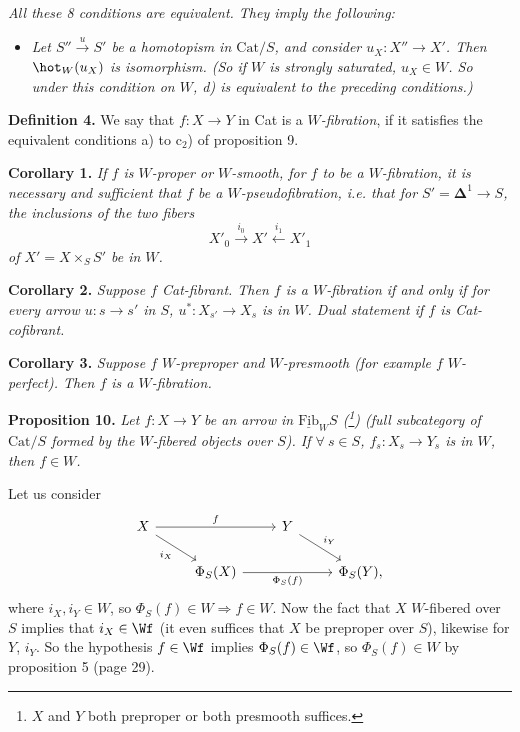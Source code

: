 \textit{All these 8 conditions are equivalent. They imply the following:}

\begin{itemize}[leftmargin=4em]
\item[\textit{d)}] \textit{Let $S'' \xrightarrow{u} S'$ be a homotopism in $\mathrm{Cat}/S$, and consider $u_X : X'' \longrightarrow X'$. Then $\hot_W(u_X)$ is isomorphism. (So if $W$ is strongly saturated, $u_X \in W$. So under this condition on $W$, d) is equivalent to the preceding conditions.)}
\end{itemize}

\textbf{Definition 4.} We say that $f : X \longrightarrow Y$ in Cat is a \textit{$W$-fibration}, if it satisfies the equivalent conditions a) to c$_2$) of proposition 9.

\textbf{Corollary 1.} \textit{If $f$ is $W$-proper or $W$-smooth, for $f$ to be a $W$-fibration, it is necessary and sufficient that $f$ be a $W$-pseudofibration, i.e. that for $S' = \mathbf{\Delta}^1 \longrightarrow S$, the inclusions of the two fibers}
\[ X'_0 \xrightarrow{i_0} X' \xleftarrow{i_1} X'_1 \]
\textit{of $X' = X \times_S S'$ be in $W$.}

\textbf{Corollary 2.} \textit{Suppose $f$ \textup{Cat}-fibrant. Then $f$ is a $W$-fibration if and only if for every arrow $u : s \longrightarrow s'$ in $S$, $u^* : X_{s'} \longrightarrow X_s$ is in $W$. Dual statement if $f$ is \textup{Cat}-cofibrant.} %

\textbf{Corollary 3.} \textit{Suppose $f$ $W$-preproper and $W$-presmooth (for example $f$ $W$-perfect). Then $f$ is a $W$-fibration.}

\textbf{Proposition 10.} \textit{Let $f : X \longrightarrow Y$ be an arrow in $\underline{\mathrm{Fib}}_WS$ (\footnote[59]{$X$ and $Y$ both preproper or both presmooth suffices.}) (full subcategory of $\mathrm{Cat}/S$ formed by the $W$-fibered objects over $S$). If $\forall\ s \in S$, $f_s : X_s \longrightarrow Y_s$ is in $W$, then $f \in W$.}

Let us consider
\[ \begin{tikzcd}
X \arrow[rr, "f"] \arrow[dr, "i_X"'] & & Y \arrow[dr, "i_Y"] & \\
 & \Phi_S(X) \arrow[rr, "\Phi_S(f)"'] & & \Phi_S(Y),
\end{tikzcd} \]
where $i_X, i_Y \in W$, so $\Phi_S(f) \in W \Rightarrow f \in W$. Now the fact that $X$ $W$-fibered over $S$ implies that $i_X \in \Wf$ (it even suffices that $X$ be preproper over $S$), likewise for $Y$, $i_Y$. So the hypothesis $f \in \Wf$ implies $\Phi_S(f) \in \Wf$, so $\Phi_S(f) \in W$ by proposition 5 (page 29).
